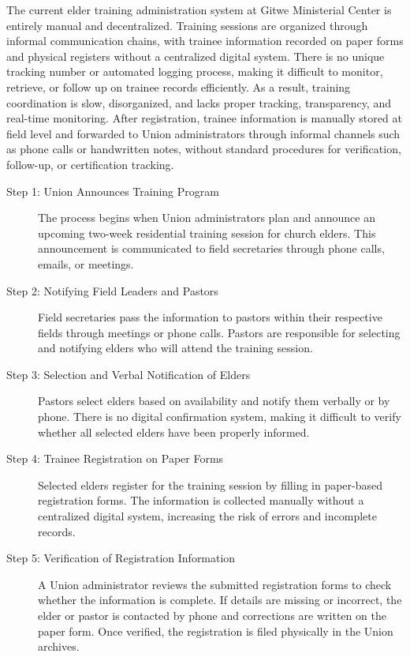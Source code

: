 \documentclass[12pt]{report}
\begin{document}
The current elder training administration system at Gitwe Ministerial Center is entirely manual and decentralized. Training sessions are organized through informal communication chains, with trainee information recorded on paper forms and physical registers without a centralized digital system. There is no unique tracking number or automated logging process, making it difficult to monitor, retrieve, or follow up on trainee records efficiently. As a result, training coordination is slow, disorganized, and lacks proper tracking, transparency, and real-time monitoring. After registration, trainee information is manually stored at field level and forwarded to Union administrators through informal channels such as phone calls or handwritten notes, without standard procedures for verification, follow-up, or certification tracking.

\begin{description}
    \item[Step 1: Union Announces Training Program] The process begins when Union administrators plan and announce an upcoming two-week residential training session for church elders. This announcement is communicated to field secretaries through phone calls, emails, or meetings.
    \item[Step 2: Notifying Field Leaders and Pastors] Field secretaries pass the information to pastors within their respective fields through meetings or phone calls. Pastors are responsible for selecting and notifying elders who will attend the training session.
    \item[Step 3: Selection and Verbal Notification of Elders] Pastors select elders based on availability and notify them verbally or by phone. There is no digital confirmation system, making it difficult to verify whether all selected elders have been properly informed.
    \item[Step 4: Trainee Registration on Paper Forms] Selected elders register for the training session by filling in paper-based registration forms. The information is collected manually without a centralized digital system, increasing the risk of errors and incomplete records.
    \item[Step 5: Verification of Registration Information] A Union administrator reviews the submitted registration forms to check whether the information is complete. If details are missing or incorrect, the elder or pastor is contacted by phone and corrections are written on the paper form. Once verified, the registration is filed physically in the Union archives.
\end{description}
\end{document}

